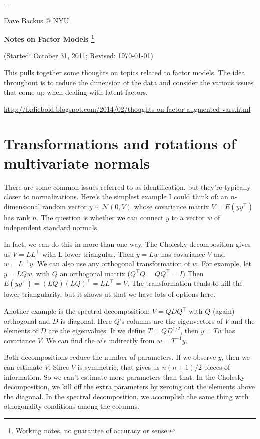\documentclass[11pt]{article}
\begin{document}
\parskip=\bigskipamount
\parindent=0.0in
\thispagestyle{empty}
\begin{flushright} Dave Backus @ NYU \end{flushright}

\bigskip
\centerline{\Large \bf Notes on Factor Models%
\footnote{Working notes, no guarantee of accuracy or sense.}}
\centerline{(Started: October 31, 2011; Revised: \today)}

\bigskip
This pulls together some thoughts on topics related
to factor models.
The idea throughout is to reduce the dimension
of the data and consider the various issues that come up when dealing with
latent factors.

\url{http://fxdiebold.blogspot.com/2014/02/thoughts-on-factor-augmented-vars.html} 


\section{Transformations and rotations of multivariate normals}

There are some common issues referred to as identification,
but they're typically closer to normalizations.
Here's the simplest example I could think of:
an $n$-dimensional random vector $y \sim \mathcal{N} (0,V)$ whose
covariance matrix $V = E(y y^\top)$ has rank $ n$.
The question is whether we can connect $y$ to a vector $w$ of independent standard normals.

In fact, we can do this in more than one way.
The Cholesky decomposition gives us
$ V =  L L^\top $ with L lower triangular.
Then $y = L w$ has covariance $V$ and $ w = L^{-1} y$.
We can also use any
\href{http://en.wikipedia.org/wiki/Orthogonal_matrix}{orthogonal transformation} of $w$.
For example, let $y = L Q w$,
with $Q$ an orthogonal matrix ($Q^\top Q = Q Q^\top = I$)
Then $ E (y y^\top) = (LQ)(LQ)^\top = L L^\top = V$.
The transformation tends to kill the lower triangularity,
but it shows ut that we have lots of options here.

Another example is the spectral decomposition:
$ V = Q D Q^\top$ with $Q$ (again) orthogonal and $D$ is diagonal.
Here $Q$'s columns are the eigenvectors of $V$
and the elements of $D$ are the eigenvalues.
If we define $T = Q D^{1/2}$, then $y = T w$ has covariance $V$.
We can find the $w$'s indirectly from $ w = T^{-1} y$.


Both decompositions reduce the number of parameters.
If we observe $y$, then we can estimate $V$.
Since $V$ is symmetric, that gives us $n (n+1)/2$ pieces of information.
So we can't estimate more parameters than that.
In the Cholesky decomposition, we kill off the extra parameters
by zeroing out the elements above the diagonal.
In the spectral decomposition,
we accomplish the same thing with othogonality conditions among the columns.
\end{document}
